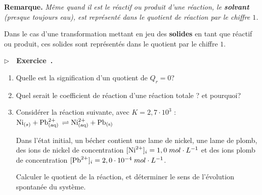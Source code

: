 \documentclass[11pt,a4paper]{article}
\newcommand{\mpl}{\; mol\cdot L^{-1}}
\newcommand{\es}[1]{\cdot10^{#1}}
\newcounter{exo}
\newenvironment{exo}[1][]
 {\refstepcounter{exo} \begin{shaded}\noindent $\triangleright \quad$\textbf{Exercice~\theexo. #1} } { \end{shaded}}
\newenvironment{rmrq}
 {\begin{shaded} \textbf{Remarque.\quad } \itshape } { \end{shaded}}
\begin{document}
\begin{rmrq}
Même quand il est le réactif ou produit d’une réaction, le \textbf{solvant} (presque toujours eau), est représenté dans le quotient de réaction par le chiffre $1$.

Dans le cas d’une transformation mettant en jeu des \textbf{solides} en tant que réactif ou produit, ces solides sont représentés dans le quotient par le chiffre $1$.
\end{rmrq}

\begin{exo}
\begin{enumerate}
    \item Quelle est la signification d'un quotient de $Q_r = 0$? 
    \vspace{.5cm}
    \item Quel serait le coefficient de réaction d’une réaction totale ? et pourquoi?
    \vspace{.5cm}
    \item Considérer la réaction suivante, avec $K = 2,7\es{3}$ : $\ce{Ni}_{(s)} + \ce{Pb^2+_{(aq)} \rightleftharpoons \ce{Ni^2+_{(aq)}} + \ce{Pb_{(s)}}}$
    
    Dans l'état initial, un bécher contient une lame de nickel, une lame de plomb, des ions de nickel de concentration $[\ce{Ni^2+}]_i=1,0 \mpl$ et des ions plomb de concentration $[\ce{Pb^2+}]_i=2,0\es{-4}\mpl$. 
    
    Calculer le quotient de la réaction, et déterminer le sens de l'évolution spontanée du système. 
    \vspace{2cm}
\end{enumerate} 
\end{exo}	 
 
\end{document}
